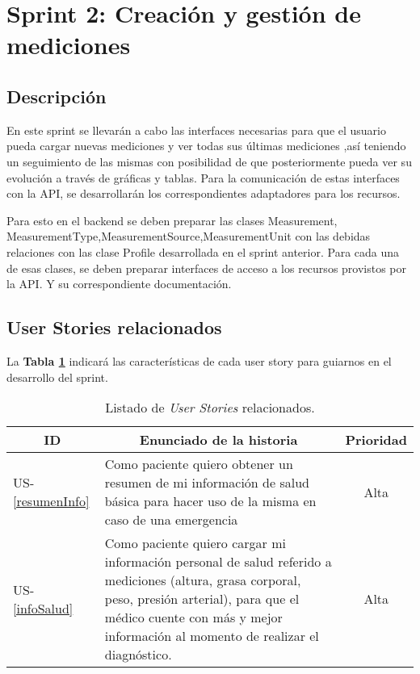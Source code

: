 \section{Sprint 2: Creación y gestión de mediciones} %


\subsection{Descripción}
En este sprint se llevarán a cabo las interfaces necesarias para que el usuario pueda cargar nuevas mediciones y ver todas sus últimas mediciones ,así teniendo un seguimiento de las mismas con posibilidad de que posteriormente pueda ver su evolución a través de gráficas y tablas.
Para la comunicación de estas interfaces con la API, se desarrollarán los correspondientes adaptadores para los recursos.

Para esto en el backend se deben preparar las clases Measurement, MeasurementType,MeasurementSource,MeasurementUnit con las debidas relaciones con las clase Profile desarrollada en el sprint anterior.
Para cada una de esas clases, se deben preparar interfaces de acceso a los recursos provistos por la API. Y su correspondiente documentación.


\subsection{User Stories relacionados}
La \textbf{Tabla \ref{US-Sprint2}} indicará las características de cada user story para guiarnos en el desarrollo del sprint.

\begin{table}[h]
    \centering
	\begin{tabular}{|l|p{9cm}|c|}
	\hline
        \multicolumn{1}{|c|}{\textbf{ID}} &
        \multicolumn{1}{|c|}{\textbf{Enunciado de la historia}} &
        \textbf{Prioridad} \\          
    \hline
        US-\ref{resumenInfo} &
        Como paciente quiero obtener un resumen de mi información de salud básica para hacer uso de la misma en caso de una emergencia &Alta
        \\
    \hline 
	    US-\ref{infoSalud} &
        Como paciente quiero cargar mi información personal de salud referido a mediciones (altura, grasa corporal, peso, presión arterial), para que el médico cuente con más y mejor información al momento de realizar el diagnóstico. & Alta
        \\
    \hline
    \end{tabular}
    \caption{Listado de \textit{User Stories} relacionados.}
    \label{US-Sprint2}
\end{table}

